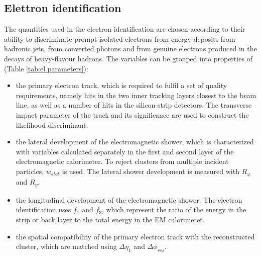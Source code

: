 \documentclass[a4paper, oneside]{book}
\begin{document}
			\subsection{Elettron identification}
			The quantities used in the electron identification \cite{El ph reco} are chosen according to their ability to discriminate prompt isolated electrons from energy deposits from hadronic jets, from converted photons and from genuine electrons produced in the decays of heavy-flavour hadrons. The variables can be
			grouped into properties of (Table \ref{tab:el parameters}):
			\begin{itemize}
				\item the primary electron track, which is required to fulfil a set of quality requirements, namely hits in the two inner tracking layers closest to the beam line, as well as a number of hits in the silicon-strip detectors. The transverse impact parameter of the track and its significance are used to construct
				the likelihood discriminant.
				\item the lateral development of the electromagnetic shower, which is characterized with variables calculated separately in the first and second layer of the electromagnetic calorimeter. To reject clusters from multiple incident particles, $w_{s tot}$ is used. The lateral shower development is measured with $R_{\varphi}$ and $R_{\eta}$.
				\item the longitudinal development of the electromagnetic shower. The electron identification uses $f_1$ and $f_3$, which represent the ratio of the energy in the strip or back layer to the total energy in the EM calorimeter.
				\item the spatial compatibility of the primary electron track with the reconstructed cluster, which are matched using $\Delta\eta_1$ and $\Delta\phi_{res}$. 
			\end{itemize}
\end{document}
